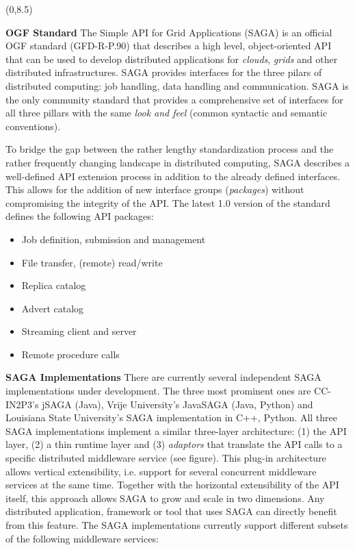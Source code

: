 \documentclass[a0b,portrait]{a0poster}
\def\LHead#1{\bigskip\bigskip\noindent{\huge\color{HeadColor} #1}\smallskip}
\begin{document}
\begin{textblock}{7}(0,8.5)

\LHead{What is SAGA ?}
\large

\textbf{\color{DarkBlue} OGF Standard } The Simple API for Grid Applications
(SAGA) is an official OGF standard (GFD-R-P.90) that describes a high level,
object-oriented API that can be used to develop distributed applications for
\textit{clouds}, \textit{grids} and other distributed infrastructures. SAGA
provides interfaces for the three pilars of distributed computing: job
handling, data handling and communication. SAGA is the only community standard
that provides a comprehensive set of interfaces for all three pillars with the
same \textit{look and feel} (common syntactic and semantic conventions).

To bridge the gap between the rather lengthy standardization process and the
rather frequently changing landscape in distributed computing, SAGA describes
a well-defined API extension process in addition to the already defined
interfaces. This allows for the addition of new interface groups
(\textit{packages}) without compromising the integrity of the API. The
latest 1.0 version of the standard defines the following API packages:

\begin{itemize} 
\item{Job definition, submission and management }
\item{File transfer, (remote) read/write } 
\item{Replica catalog }
\item{Advert catalog } 
\item{Streaming client and server } 
\item{Remote procedure calls } 
\end{itemize}

\textbf{\color{DarkBlue} SAGA Implementations } There are currently several
independent SAGA implementations under development. The three most prominent
ones are CC-IN2P3's jSAGA (Java), Vrije University's JavaSAGA (Java, Python)
and Louisiana State University's SAGA implementation in C++, Python. All three
SAGA implementations implement a similar three-layer architecture: (1) the API
layer, (2) a thin runtime layer and (3) \textit{adaptors} that translate the
API calls to a specific distributed middleware service (see figure). This
plug-in architecture allows vertical extensibility, i.e. support for several
concurrent middleware services at the same time. Together with the horizontal
extensibility of the API itself, this approach allows SAGA to grow and scale
in two dimensions. Any distributed application, framework or tool that uses
SAGA can directly benefit from this feature. The SAGA implementations
currently support different subsets of the following middleware services:


\end{textblock}
\end{document}
